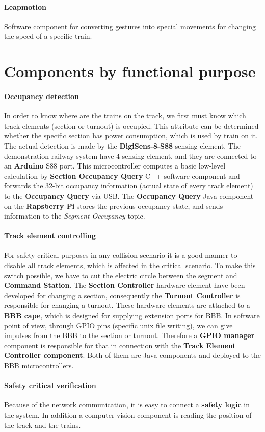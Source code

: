 \paragraph{Leapmotion}
Software component for converting gestures into special movements for changing the speed of a specific train.

\section{Components by functional purpose}
\paragraph{Occupancy detection}\label{par:FunctionOccupancyDetection}
In order to know where are the trains on the track, we first must know which track elements (section or turnout) is occupied. This attribute can be determined whether the specific section has power consumption, which is used by train on it. The actual detection is made by the\textbf{ DigiSens-8-S88} sensing element. The demonstration railway system have 4 sensing element, and they are connected to an\textbf{ Arduino} S88 port. This microcontroller computes a basic low-level calculation by \textbf{Section Occupancy Query} C++ software component and forwards the 32-bit occupancy information (actual state of every track element) to the \textbf{Occupancy Query} via USB. The\textbf{ Occupancy Query} Java component on the \textbf{Rapsberry Pi} stores the previous occupancy state, and sends information to the \textit{Segment Occupancy} topic.

\paragraph{Track element controlling}\label{par:FunctionTEC}
For safety critical purposes in any collision scenario it is a good manner to disable all track elements, which is affected in the critical scenario. To make this switch possible, we have to cut the electric circle between the segment and \textbf{Command Station}. The \textbf{Section Controller} hardware element have been developed for changing a section, consequently the \textbf{Turnout Controller} is responsible for changing a turnout. These hardware elements are attached to a \textbf{BBB cape}, which is designed for supplying extension ports for BBB. In software point of view, through GPIO pins (specific unix file writing), we can give impulses from the BBB to the section or turnout. Therefore a \textbf{GPIO manager} component is responsible for that in connection with the \textbf{Track Element Controller component}. Both of them are Java components and deployed to the BBB microcontrollers.

\paragraph{Safety critical verification}
Because of the network communication, it is easy to connect a \textbf{safety logic} in the system. In addition a computer vision component is reading the position of the track and the trains. 
